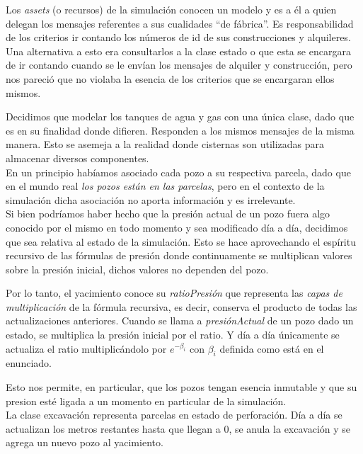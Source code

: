 Los \emph{assets} (o recursos) de la simulación conocen un modelo y es a él a quien delegan los mensajes referentes a sus cualidades ``de fábrica''. Es responsabilidad de los criterios ir contando los números de id de sus construcciones y alquileres. Una alternativa a esto era consultarlos a la clase estado o que esta se encargara de ir contando cuando se le envían los mensajes de alquiler y construcción, pero nos pareció que no violaba la esencia de los criterios que se encargaran ellos mismos. 

Decidimos que modelar los tanques de agua y gas con una única clase, dado que es en su finalidad donde difieren. Responden a los mismos mensajes de la misma manera. Esto se asemeja a la realidad donde cisternas son utilizadas para almacenar diversos componentes.
\\

En un principio habíamos asociado cada pozo a su respectiva parcela, dado que en el mundo real \emph{los pozos están en las parcelas}, pero en el contexto de la simulación dicha asociación no aporta información y es irrelevante.
\\

Si bien podríamos haber hecho que la presión actual de un pozo fuera algo conocido por el mismo en todo momento y sea modificado día a día, decidimos que sea relativa al estado de la simulación. Esto se hace aprovechando el espíritu recursivo de las fórmulas de presión donde continuamente se multiplican valores sobre la presión inicial, dichos valores no dependen del pozo. 

Por lo tanto, el yacimiento conoce su \emph{ratioPresión} que representa las \emph{capas de multiplicación} de la fórmula recursiva, es decir, conserva el producto de todas las actualizaciones anteriores. Cuando se llama a \emph{presiónActual} de un pozo dado un estado, se multiplica la presión inicial por el ratio. Y día a día únicamente se actualiza el ratio multiplicándolo por $e^{-\beta_i}$ con $\beta_i$ definida como está en el enunciado.

Esto nos permite, en particular, que los pozos tengan esencia inmutable y que su presion esté ligada a un momento en particular de la simulación.
\\

La clase excavación representa parcelas en estado de perforación. Día  a día se actualizan los metros restantes hasta que llegan a 0, se anula la excavación y se agrega un nuevo pozo al yacimiento.
\\


